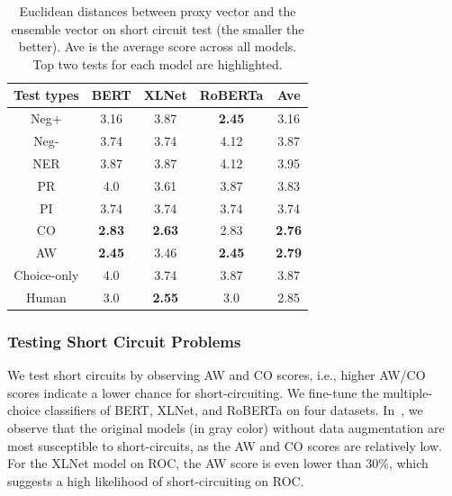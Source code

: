 
\begin{table}[th]
\scriptsize
\centering
\begin{tabular}{c|cccc}\hline
\toprule  
\textbf{Test types} &BERT  & XLNet & RoBERTa  &Ave\\ 
 \midrule
{Neg+}      &     3.16	&3.87&	\textbf{2.45}	&3.16\\
\midrule
{Neg-}&    3.74&3.74&	4.12&	3.87\\
\midrule
{NER}    &    3.87&	3.87	&4.12	&3.95\\
\midrule
{PR}&   4.0&	3.61&	3.87	&3.83\\
\midrule
{PI}&    3.74	&3.74&	3.74&	3.74\\
\midrule
{CO}            & \textbf{ 2.83}	&\textbf{2.63}	&2.83	&\textbf{2.76}\\
\midrule
{AW}   &  \textbf{2.45}	&3.46&	\textbf{2.45}	&\textbf{2.79} \\
\midrule
{Choice-only}   &     4.0&	3.74&	3.87&	3.87\\
\midrule
{Human}   &3.0&	\textbf{2.55}&	3.0&	2.85\\
\bottomrule
\hline
\end{tabular}
\caption{\label{tab:agree} 
Euclidean distances between proxy vector and 
the ensemble vector on short circuit test (the smaller
the better). 
Ave is the average score across all models.
Top two tests for each model are highlighted.}
\end{table}

\subsubsection{Testing Short Circuit Problems}
\label{sec:fix-sc}
We test short circuits by observing AW and CO scores, i.e., higher AW/CO scores indicate a lower chance for short-circuiting. We fine-tune the multiple-choice classifiers of BERT, XLNet, and RoBERTa on four datasets. In~, we observe that the original models (in gray color) without data augmentation are most susceptible to short-circuits, as the AW and CO scores are relatively low. For the XLNet model on ROC, the AW score is even lower than 30\%, which suggests a high likelihood of short-circuiting on ROC.


